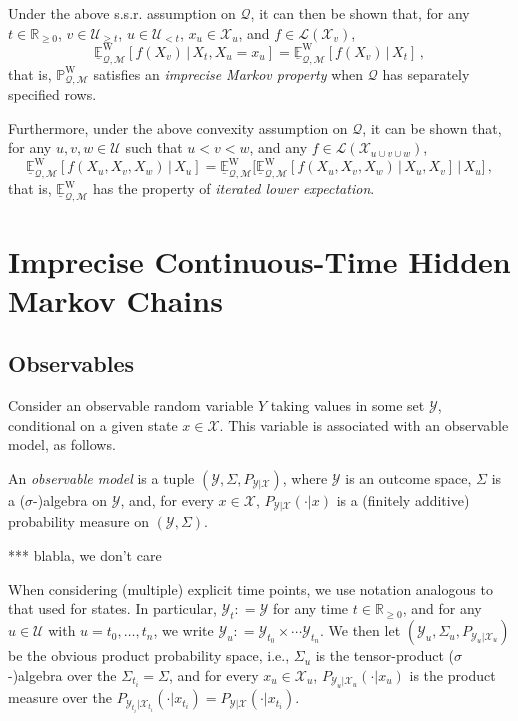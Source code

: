 \documentclass[twoside,11pt]{article}
\newcommand{\reals}{\mathbb{R}}
\newcommand{\realsnonneg}{\reals_{\geq 0}}
\newcommand{\states}{\mathcal{X}}
\newcommand{\observs}{\mathcal{Y}}
\newcommand{\processes}{\mathbb{P}}
\newcommand{\wprocesses}{\processes^{\mathrm{W}}}
\newcommand{\lexp}{\underline{\mathbb{E}}_{\rateset,\mathcal{M}}^\mathrm{W}}
\newcommand{\gambles}{\mathcal{L}}
\newcommand{\rateset}{\mathcal{Q}}
\newcommand{\coloneqq}{:\!=}
\begin{document}
Under the above s.s.r. assumption on $\rateset$, it can then be shown that, for any $t\in\realsnonneg$, $v\in\mathcal{U}_{\geq t}$, $u\in\mathcal{U}_{<t}$, $x_u\in\states_u$, and $f\in\gambles(\states_v)$,
\begin{equation*}
\lexp[f(X_v)\,\vert\,X_t,X_u=x_u] = \lexp[f(X_v)\,\vert\,X_t]\,,
\end{equation*}
that is, $\wprocesses_{\rateset,\mathcal{M}}$ satisfies an \emph{imprecise Markov property} when $\rateset$ has separately specified rows.

Furthermore, under the above convexity assumption on $\rateset$, it can be shown that, for any $u,v,w\in\mathcal{U}$ such that $u<v<w$, and any $f\in\gambles(\states_{u\cup v\cup w})$,
\begin{equation*}
\lexp[f(X_u,X_v,X_w)\,\vert\,X_u] = \lexp\bigl[\lexp[f(X_u,X_v,X_w)\,\vert\,X_u,X_v]\,\big\vert\,X_u\bigr]\,,
\end{equation*}
that is, $\lexp$ has the property of \emph{iterated lower expectation}.

\section{Imprecise Continuous-Time Hidden Markov Chains}\label{sec:icthmc}

\subsection{Observables}

Consider an observable random variable $Y$ taking values in some set $\observs$, conditional on a given state $x\in\states$. This variable is associated with an observable model, as follows.

\begin{definition}
An \emph{observable model} is a tuple $(\observs,\Sigma,P_{\observs\vert \states})$, where $\observs$ is an outcome space, $\Sigma$ is a ($\sigma$-)algebra on $\observs$, and, for every $x\in\states$, $P_{\observs\vert\states}(\cdot\vert x)$ is a (finitely additive) probability measure on $(\observs,\Sigma)$.
\end{definition}
*** blabla, we don't care

When considering (multiple) explicit time points, we use notation analogous to that used for states. In particular, $\observs_t\coloneqq\observs$ for any time $t\in\realsnonneg$, and for any $u\in\mathcal{U}$ with $u=t_0,\ldots,t_n$, we write $\observs_u\coloneqq \observs_{t_0}\times\cdots\observs_{t_n}$. We then let $(\observs_u,\Sigma_u,P_{\observs_u\vert\states_u})$ be the obvious product probability space, i.e., $\Sigma_u$ is the tensor-product ($\sigma$-)algebra over the $\Sigma_{t_i}=\Sigma$, and for every $x_u\in\states_u$, $P_{\observs_u\vert\states_u}(\cdot\vert x_u)$ is the product measure over the $P_{\observs_{t_i}\vert\states_{t_i}}(\cdot\vert x_{t_i})=P_{\observs\vert\states}(\cdot\vert x_{t_i})$.
\end{document}
